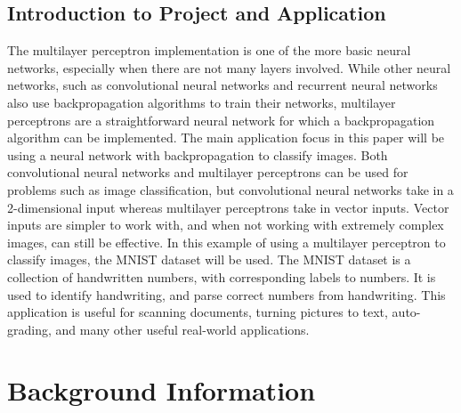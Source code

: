 \documentclass[twocolumn]{article}
\begin{document}
\subsection{Introduction to Project and Application}
The multilayer perceptron implementation is one of the more basic neural networks, especially when there are not many layers involved. While other neural networks, such as convolutional neural networks and recurrent neural networks also use backpropagation algorithms to train their networks, multilayer perceptrons are a straightforward neural network for which a backpropagation algorithm can be implemented. The main application focus in this paper will be using a neural network with backpropagation to classify images. Both convolutional neural networks and multilayer perceptrons can be used for problems such as image classification, but  convolutional neural networks take in a 2-dimensional input whereas multilayer perceptrons take in vector inputs. Vector inputs are simpler to work with, and when not working with extremely complex images, can still be effective. In this example of using a multilayer perceptron to classify images, the MNIST dataset \cite{lecun2010mnist} will be used. The MNIST dataset is a collection of handwritten numbers, with corresponding labels to numbers. It is used to identify handwriting, and parse correct numbers from handwriting. This application is useful for scanning documents, turning pictures to text, auto-grading, and many other useful real-world applications.  
\section{Background Information}
\end{document}
